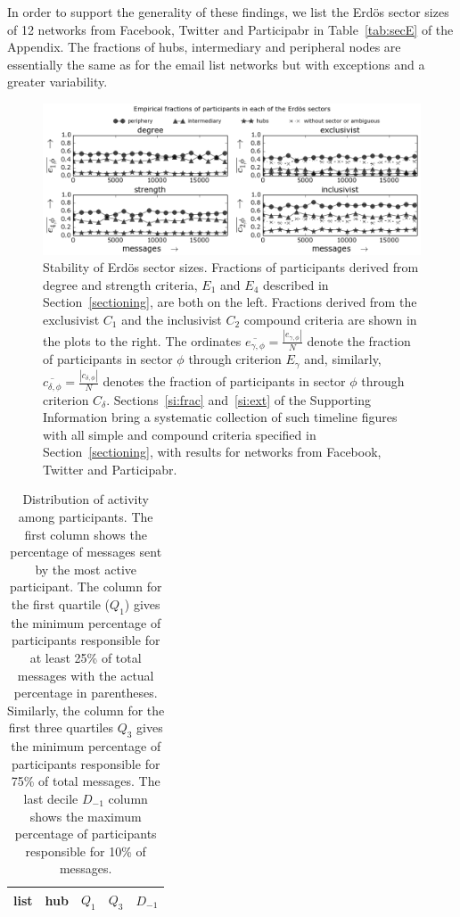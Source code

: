 In order to support the generality of these findings,
we list the Erd\"os sector sizes of 12 networks from Facebook, Twitter and Participabr in Table~\ref{tab:secE} of the Appendix.
The fractions of hubs, intermediary and peripheral nodes are
essentially the same as for the email list networks but with exceptions and a greater variability.

\begin{figure} 
\centering
\includegraphics[width=\textwidth]{figs/InText-WLAU-S1000__}
\caption{Stability of Erd\"os sector sizes.
Fractions of participants derived from degree and strength criteria, $E_1$ and $E_4$ described in Section~\ref{sectioning}, are both on the left.
Fractions derived from the exclusivist $C_1$ and the inclusivist $C_2$ compound criteria are shown in the plots to the right.
The ordinates $\overline{e_{\gamma,\phi}}=\frac{|e_{\gamma,\phi}|}{N}$ denote the fraction of participants in sector $\phi$ through criterion $E_\gamma$
and, similarly, $\overline{c_{\delta,\phi}}=\frac{|c_{\delta,\phi}|}{N}$ denotes the fraction of participants in sector $\phi$ through criterion $C_\delta$.
Sections~\ref*{si:frac} and~\ref*{si:ext} of the Supporting Information bring a systematic collection of such timeline figures with all simple and compound criteria specified in Section~\ref{sectioning}, with results for networks from Facebook, Twitter and Participabr.}
\label{fig:sectIL}
\end{figure}


\begin{table}[h]
\caption{Distribution of activity among participants.
The first column shows the percentage of messages sent by the most active participant. The column for the first quartile ($Q_1$) gives the minimum percentage of participants responsible for at least 25\% of total messages with the actual percentage in parentheses. Similarly, the column for the first three quartiles $Q_3$ gives the minimum percentage of participants responsible for 75\% of total messages.
The last decile $D_{-1}$ column shows the maximum percentage of participants responsible for 10\% of messages.}
\begin{center}
\begin{tabular}{ | l ||  c | c | c | c | }
\hline
list & hub & $ Q_1 $ & $ Q_3 $ & $D_{-1}$ \\ \hline

\end{tabular}
\end{center}
\label{autores}
\end{table}


